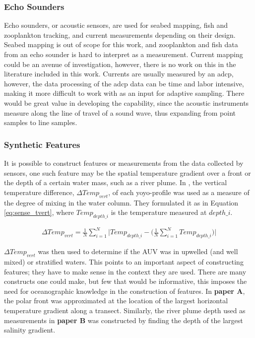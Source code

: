 \subsubsection*{Echo Sounders}
Echo sounders, or acoustic sensors, are used for seabed mapping, fish and zooplankton tracking, and current measurements depending on their design. Seabed mapping is out of scope for this work, and zooplankton and fish data from an echo sounder is hard to interpret as a measurement. Current mapping could be an avenue of investigation, however, there is no work on this in the literature included in this work. Currents are usually measured by an \acrshort{adcp}, however, the data processing of the \acrshort{adcp} data can be time and labor intensive, making it more difficult to work with as an input for adaptive sampling. There would be great value in developing the capability, since the acoustic instruments measure along the line of travel of a sound wave, thus expanding from point samples to line samples. 

\subsubsection*{Synthetic Features}
It is possible to construct features or measurements from the data collected by sensors, one such feature may be the spatial temperature gradient over a front or the depth of a certain water mass, such as a river plume. In \cite{zhang2016autonomous}, the vertical temperature difference, $\Delta Temp_{vert}$, of each yoyo-profile was used as a measure of the degree of mixing in the water column. They formulated it as in Equation \eqref{eq:sense_tvert}, where $Temp_{depth\_i}$ is the temperature measured at $depth\_i$. 

\begin{align}
    \label{eq:sense_tvert}
    \Delta Temp_{vert} = \frac{1}{N} \sum_{i=1}^N \Big|Temp_{depth\_i}-\Big(\frac{1}{N} \sum_{i=1}^N Temp_{depth\_i} \Big)\Big|
\end{align}

$\Delta Temp_{vert}$ was then used to determine if the AUV was in upwelled (and well mixed) or stratified waters. This points to an important aspect of constructing features; they have to make sense in the context they are used. There are many constructs one could make, but few that would be informative, this imposes the need for oceanographic knowledge in the construction of features. In \textbf{paper A}, the polar front was approximated at the location of the largest horizontal temperature gradient along a transect. Similarly, the river plume depth used as measurements in \textbf{paper B} was constructed by finding the depth of the largest salinity gradient. 



